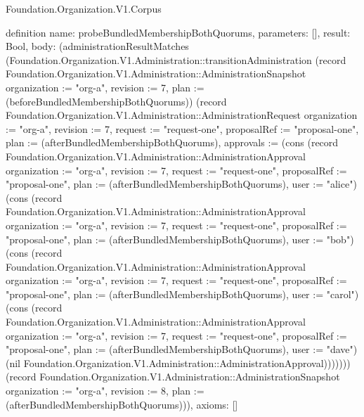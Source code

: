 \begin{lexlean}{Foundation.Organization.V1.Corpus}
\begin{semanticmodule}
definition{
  name: probeBundledMembershipBothQuorums,
  parameters: [],
  result: Bool,
  body: (administrationResultMatches (Foundation.Organization.V1.Administration::transitionAdministration (record Foundation.Organization.V1.Administration::AdministrationSnapshot {organization := "org-a", revision := 7, plan := (beforeBundledMembershipBothQuorums)}) (record Foundation.Organization.V1.Administration::AdministrationRequest {organization := "org-a", revision := 7, request := "request-one", proposalRef := "proposal-one", plan := (afterBundledMembershipBothQuorums), approvals := (cons (record Foundation.Organization.V1.Administration::AdministrationApproval {organization := "org-a", revision := 7, request := "request-one", proposalRef := "proposal-one", plan := (afterBundledMembershipBothQuorums), user := "alice"}) (cons (record Foundation.Organization.V1.Administration::AdministrationApproval {organization := "org-a", revision := 7, request := "request-one", proposalRef := "proposal-one", plan := (afterBundledMembershipBothQuorums), user := "bob"}) (cons (record Foundation.Organization.V1.Administration::AdministrationApproval {organization := "org-a", revision := 7, request := "request-one", proposalRef := "proposal-one", plan := (afterBundledMembershipBothQuorums), user := "carol"}) (cons (record Foundation.Organization.V1.Administration::AdministrationApproval {organization := "org-a", revision := 7, request := "request-one", proposalRef := "proposal-one", plan := (afterBundledMembershipBothQuorums), user := "dave"}) (nil Foundation.Organization.V1.Administration::AdministrationApproval)))))})) (record Foundation.Organization.V1.Administration::AdministrationSnapshot {organization := "org-a", revision := 8, plan := (afterBundledMembershipBothQuorums)})),
  axioms: []
}


\end{semanticmodule}
\end{lexlean}
